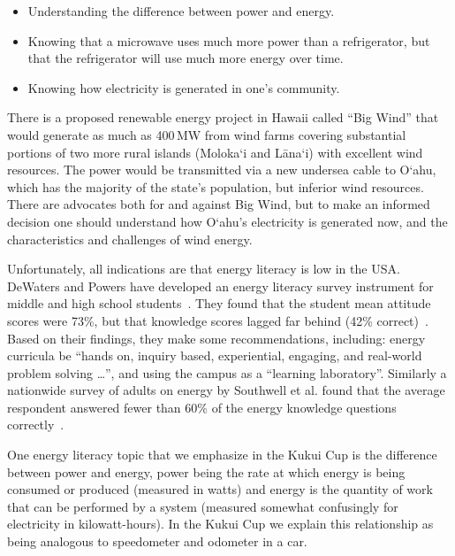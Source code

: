 \documentclass{sigchi}
\begin{document}
\begin{itemize}
	\item Understanding the difference between power and energy.
	\item Knowing that a microwave uses much more power than a refrigerator, but that the refrigerator will use much more energy over time.
	\item Knowing how electricity is generated in one's community.
\end{itemize}

There is a proposed renewable energy project in Hawaii called ``Big Wind'' that would generate as much as 400\,MW from wind farms covering substantial portions of two more rural islands (Moloka`i and L\=ana`i) with excellent wind resources. The power would be transmitted via a new undersea cable to O`ahu, which has the majority of the state's population, but inferior wind resources. There are advocates both for and against Big Wind, but to make an informed decision one should understand how O`ahu's electricity is generated now, and the characteristics and challenges of wind energy.

Unfortunately, all indications are that energy literacy is low in the USA. 
DeWaters and Powers have developed an energy literacy survey instrument for middle and high school students~\cite{DeWaters2007,DeWaters2008}. They found that the student mean attitude scores were 73\%, but that knowledge scores lagged far behind (42\% correct)~\cite{DeWaters2011}. Based on their findings, they make some recommendations, including: energy curricula be ``hands on, inquiry based, experiential, engaging, and real-world problem solving \ldots'', and using the campus as a ``learning laboratory''. Similarly a nationwide survey of adults on energy by Southwell et al. found that the average respondent answered fewer than 60\% of the energy knowledge questions correctly~\cite{Southwell2012}.

One energy literacy topic that we emphasize in the Kukui Cup is the difference between power and energy, power being the rate at which energy is being consumed or produced (measured in watts) and energy is the quantity of work that can be performed by a system (measured somewhat confusingly for electricity in kilowatt-hours). In the Kukui Cup we explain this relationship as being analogous to speedometer and odometer in a car.
\end{document}

